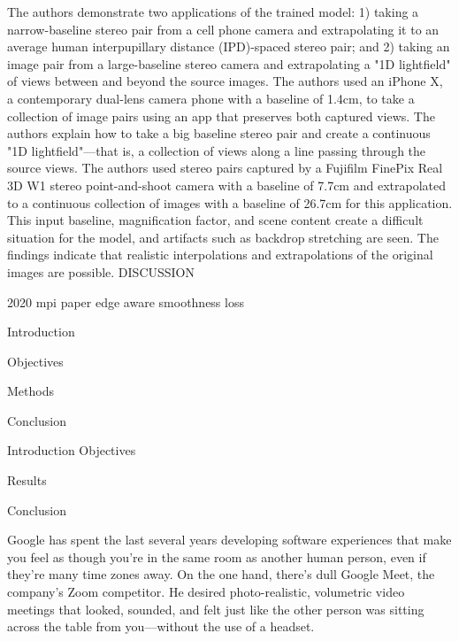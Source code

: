 The authors demonstrate two applications of the trained model: 1) taking a narrow-baseline stereo pair from a cell phone camera and extrapolating it to an average human interpupillary distance (IPD)-spaced stereo pair; and 2) taking an image pair from a large-baseline stereo camera and extrapolating a "1D lightfield" of views between and beyond the source images.
The authors used an iPhone X, a contemporary dual-lens camera phone with a baseline of 1.4cm, to take a collection of image pairs using an app that preserves both captured views.
The authors explain how to take a big baseline stereo pair and create a continuous "1D lightfield"—that is, a collection of views along a line passing through the source views.
The authors used stereo pairs captured by a Fujifilm FinePix Real 3D W1 stereo point-and-shoot camera with a baseline of 7.7cm and extrapolated to a continuous collection of images with a baseline of 26.7cm for this application.
This input baseline, magnification factor, and scene content create a difficult situation for the model, and artifacts such as backdrop stretching are seen.
The findings indicate that realistic interpolations and extrapolations of the original images are possible.
DISCUSSION

2020 mpi paper
edge aware smoothness loss

Introduction

Objectives

Methods

Conclusion

Introduction
Objectives

Results

Conclusion

Google has spent the last several years developing software experiences that make you feel as though you're in the same room as another human person, even if they're many time zones away. On the one hand, there's dull Google Meet, the company's Zoom competitor. He desired photo-realistic, volumetric video meetings that looked, sounded, and felt just like the other person was sitting across the table from you—without the use of a headset.


